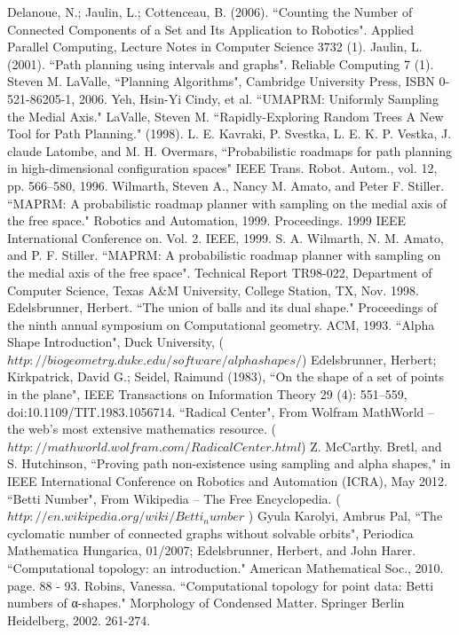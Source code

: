 \documentclass[11pt]{article}
\begin{document}
\begin{thebibliography}{1}
   Delanoue, N.; Jaulin, L.; Cottenceau, B. (2006). ``Counting the Number of Connected Components of a Set and Its Application to Robotics". Applied Parallel Computing, Lecture Notes in Computer Science 3732 (1).
   Jaulin, L. (2001). ``Path planning using intervals and graphs". Reliable Computing 7 (1).  
   Steven M. LaValle, ``Planning Algorithms", Cambridge University Press, ISBN 0-521-86205-1, 2006.
   Yeh, Hsin-Yi Cindy, et al. ``UMAPRM: Uniformly Sampling the Medial Axis."
   LaValle, Steven M. ``Rapidly-Exploring Random Trees A New Tool for Path Planning." (1998).
   L. E. Kavraki, P. Svestka, L. E. K. P. Vestka, J. claude Latombe, and M. H. Overmars, ``Probabilistic roadmaps for path planning in high-dimensional configuration spaces" IEEE Trans. Robot. Autom., vol. 12, pp. 566–580, 1996.
   Wilmarth, Steven A., Nancy M. Amato, and Peter F. Stiller. ``MAPRM: A probabilistic roadmap planner with sampling on the medial axis of the free space." Robotics and Automation, 1999. Proceedings. 1999 IEEE International Conference on. Vol. 2. IEEE, 1999.
   S. A. Wilmarth, N. M. Amato, and P. F. Stiller. ``MAPRM: A probabilistic roadmap planner with sampling on the medial axis of the free space". Technical Report TR98-022, Department of Computer Science, Texas A\&M University, College Station, TX, Nov. 1998.
   Edelsbrunner, Herbert. ``The union of balls and its dual shape." Proceedings of the ninth annual symposium on Computational geometry. ACM, 1993.
   ``Alpha Shape Introduction", Duck University, ($http://biogeometry.duke.edu/software/alphashapes/$)
   Edelsbrunner, Herbert; Kirkpatrick, David G.; Seidel, Raimund (1983), ``On the shape of a set of points in the plane", IEEE Transactions on Information Theory 29 (4): 551–559, doi:10.1109/TIT.1983.1056714.
   ``Radical Center", From Wolfram MathWorld -- the web's most extensive mathematics resource. ($http://mathworld.wolfram.com/RadicalCenter.html$)
   Z. McCarthy. Bretl, and S. Hutchinson, ``Proving path non-existence using sampling and alpha shapes," in IEEE International Conference on Robotics and Automation (ICRA), May 2012.
   ``Betti Number", From Wikipedia -- The Free Encyclopedia. ( $http://en.wikipedia.org/wiki/Betti_number$ )   
   Gyula Karolyi, Ambrus Pal, ``The cyclomatic number of connected graphs without solvable orbits", Periodica Mathematica Hungarica, 01/2007; 
  Edelsbrunner, Herbert, and John Harer. ``Computational topology: an introduction." American Mathematical Soc., 2010. page. 88 - 93.
   Robins, Vanessa. ``Computational topology for point data: Betti numbers of α-shapes." Morphology of Condensed Matter. Springer Berlin Heidelberg, 2002. 261-274.
\end{thebibliography}
\end{document}
